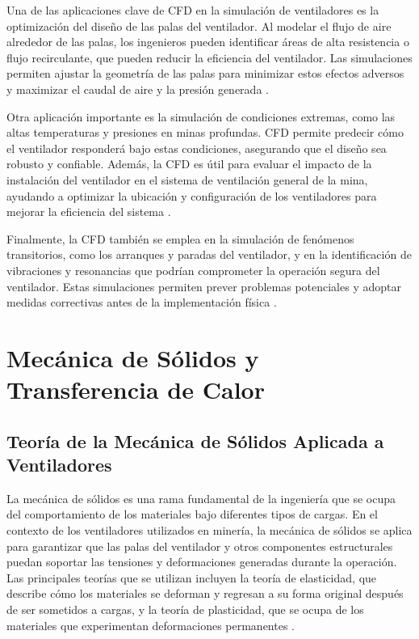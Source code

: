 Una de las aplicaciones clave de CFD en la simulación de ventiladores es la optimización del diseño de las palas del ventilador. Al modelar el flujo de aire alrededor de las palas, los ingenieros pueden identificar áreas de alta resistencia o flujo recirculante, que pueden reducir la eficiencia del ventilador. Las simulaciones permiten ajustar la geometría de las palas para minimizar estos efectos adversos y maximizar el caudal de aire y la presión generada \cite{fletcher2012computational}.

Otra aplicación importante es la simulación de condiciones extremas, como las altas temperaturas y presiones en minas profundas. CFD permite predecir cómo el ventilador responderá bajo estas condiciones, asegurando que el diseño sea robusto y confiable. Además, la CFD es útil para evaluar el impacto de la instalación del ventilador en el sistema de ventilación general de la mina, ayudando a optimizar la ubicación y configuración de los ventiladores para mejorar la eficiencia del sistema \cite{kuzmin2014cfd}.

Finalmente, la CFD también se emplea en la simulación de fenómenos transitorios, como los arranques y paradas del ventilador, y en la identificación de vibraciones y resonancias que podrían comprometer la operación segura del ventilador. Estas simulaciones permiten prever problemas potenciales y adoptar medidas correctivas antes de la implementación física \cite{wilcox2006turbulence}.

\section{Mecánica de Sólidos y Transferencia de Calor}

\subsection{Teoría de la Mecánica de Sólidos Aplicada a Ventiladores}

La mecánica de sólidos es una rama fundamental de la ingeniería que se ocupa del comportamiento de los materiales bajo diferentes tipos de cargas. En el contexto de los ventiladores utilizados en minería, la mecánica de sólidos se aplica para garantizar que las palas del ventilador y otros componentes estructurales puedan soportar las tensiones y deformaciones generadas durante la operación. Las principales teorías que se utilizan incluyen la teoría de elasticidad, que describe cómo los materiales se deforman y regresan a su forma original después de ser sometidos a cargas, y la teoría de plasticidad, que se ocupa de los materiales que experimentan deformaciones permanentes \cite{beer2012mechanics}.

